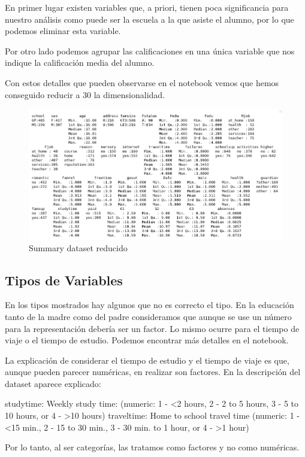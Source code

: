 \documentclass[12pt,a4paper]{article}
\begin{document}
En primer lugar existen variables que, a priori, tienen poca significancia para nuestro análisis como puede ser la escuela a la que asiste el alumno, por lo que podemos eliminar esta variable. 

Por otro lado podemos agrupar las calificaciones en una única variable que nos indique la calificación media del alumno. 

Con estos detalles que pueden observarse en el notebook vemos que hemos conseguido reducir a 30 la dimensionalidad.


\begin{figure}[ht!]
\centering
\includegraphics[trim = 0mm 0mm 0mm 0mm, clip,scale=0.4]{images/summary_nonas}
\caption{Summary dataset reducido}
\label{fig:sum3}
\end{figure}


\subsection{Tipos de Variables}
En los tipos mostrados hay algunos que no es correcto el tipo. En la educación tanto de la madre como del padre consideramos que aunque se use un número para la representación debería ser un factor. Lo mismo ocurre para el tiempo de viaje o el tiempo de estudio.  Podemos encontrar más detalles en el notebook. 


La explicación de considerar el tiempo de estudio y el tiempo de viaje es que, aunque pueden parecer numéricas, en realizar son factores. En la descripción del dataset aparece explicado:

studytime: Weekly study time: (numeric: 1 - <2 hours, 2 - 2 to 5 hours, 3 - 5 to 10 hours, or 4 - >10 hours)
traveltime: Home to school travel time (numeric: 1 - <15 min., 2 - 15 to 30 min., 3 - 30 min. to 1 hour, or 4 - >1 hour)

Por lo tanto, al ser categorías, las tratamos como factores y no como numéricas.
\end{document}
